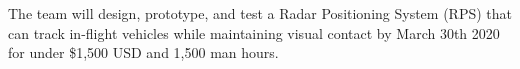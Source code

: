 
The team will design, prototype, and test a Radar Positioning System (RPS) that can track in-flight vehicles while maintaining visual contact by March 30th 2020 for under \$1,500 USD and 1,500 man hours. 
